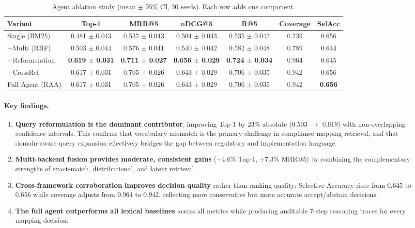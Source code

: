 \documentclass{sn-jnl}
\begin{document}
\begin{table}[h]
\caption{Agent ablation study (mean $\pm$ 95\% CI, 30 seeds). Each row adds one component.}
\label{tab:ablation}
\centering
\begin{tabular}{lcccccc}
\hline
Variant & Top-1 & MRR@5 & nDCG@5 & R@5 & Coverage & SelAcc \\
\hline
Single (BM25)    & 0.481 $\pm$ 0.043 & 0.537 $\pm$ 0.043 & 0.504 $\pm$ 0.043 & 0.535 $\pm$ 0.047 & 0.739 & 0.656 \\
+Multi (RRF)     & 0.503 $\pm$ 0.044 & 0.576 $\pm$ 0.041 & 0.540 $\pm$ 0.042 & 0.582 $\pm$ 0.048 & 0.789 & 0.644 \\
+Reformulation   & \textbf{0.619 $\pm$ 0.031} & \textbf{0.711 $\pm$ 0.027} & \textbf{0.656 $\pm$ 0.029} & \textbf{0.724 $\pm$ 0.034} & 0.964 & 0.645 \\
+CrossRef        & 0.617 $\pm$ 0.031 & 0.705 $\pm$ 0.026 & 0.643 $\pm$ 0.029 & 0.706 $\pm$ 0.035 & 0.942 & 0.656 \\
Full Agent (RAA) & 0.617 $\pm$ 0.031 & 0.705 $\pm$ 0.026 & 0.643 $\pm$ 0.029 & 0.706 $\pm$ 0.035 & 0.942 & \textbf{0.656} \\
\hline
\end{tabular}
\end{table}

\paragraph{Key findings.}
\begin{enumerate}
\item \textbf{Query reformulation is the dominant contributor}, improving Top-1 by 23\% absolute (0.503 $\rightarrow$ 0.619) with non-overlapping confidence intervals.
This confirms that vocabulary mismatch is the primary challenge in compliance mapping retrieval, and that domain-aware query expansion effectively bridges the gap between regulatory and implementation language.

\item \textbf{Multi-backend fusion provides moderate, consistent gains} (+4.6\% Top-1, +7.3\% MRR@5) by combining the complementary strengths of exact-match, distributional, and latent retrieval.

\item \textbf{Cross-framework corroboration improves decision quality} rather than ranking quality: Selective Accuracy rises from 0.645 to 0.656 while coverage adjusts from 0.964 to 0.942, reflecting more conservative but more accurate accept/abstain decisions.

\item \textbf{The full agent outperforms all lexical baselines} across all metrics while producing auditable 7-step reasoning traces for every mapping decision.
\end{enumerate}
\end{document}
